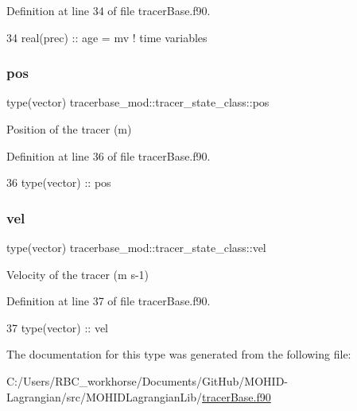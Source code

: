Definition at line 34 of file tracer\+Base.\+f90.


\begin{DoxyCode}
34         \textcolor{keywordtype}{real(prec)} :: age = mv             \textcolor{comment}{! time variables}
\end{DoxyCode}
\mbox{\label{structtracerbase__mod_1_1tracer__state__class_a184b3ecbe519a6cc7468fa3060131ce0}} 
\subsubsection{\texorpdfstring{pos}{pos}}
{\footnotesize\ttfamily type(vector) tracerbase\+\_\+mod\+::tracer\+\_\+state\+\_\+class\+::pos\hspace{0.3cm}{\ttfamily [private]}}



Position of the tracer (m) 



Definition at line 36 of file tracer\+Base.\+f90.


\begin{DoxyCode}
36         \textcolor{keywordtype}{type}(vector) :: pos
\end{DoxyCode}
\mbox{\label{structtracerbase__mod_1_1tracer__state__class_ae94928588f703077bae9de12c8e9d14b}} 
\subsubsection{\texorpdfstring{vel}{vel}}
{\footnotesize\ttfamily type(vector) tracerbase\+\_\+mod\+::tracer\+\_\+state\+\_\+class\+::vel\hspace{0.3cm}{\ttfamily [private]}}



Velocity of the tracer (m s-\/1) 



Definition at line 37 of file tracer\+Base.\+f90.


\begin{DoxyCode}
37         \textcolor{keywordtype}{type}(vector) :: vel
\end{DoxyCode}


The documentation for this type was generated from the following file\+:\begin{DoxyCompactItemize}
\item 
C\+:/\+Users/\+R\+B\+C\+\_\+workhorse/\+Documents/\+Git\+Hub/\+M\+O\+H\+I\+D-\/\+Lagrangian/src/\+M\+O\+H\+I\+D\+Lagrangian\+Lib/\mbox{\hyperlink{tracer_base_8f90}{tracer\+Base.\+f90}}\end{DoxyCompactItemize}
